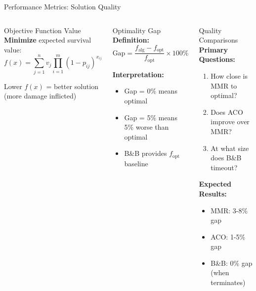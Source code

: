 \documentclass[aspectratio=43,8pt]{beamer}
\begin{document}
\begin{frame}{Performance Metrics: Solution Quality}
\begin{columns}[t]
\begin{block}{Objective Function Value}
\textbf{Minimize} expected survival value:
$$f(x) = \sum_{j=1}^{n} v_j \prod_{i=1}^{m} (1-p_{ij})^{x_{ij}}$$

Lower $f(x)$ = better solution (more damage inflicted)
\end{block}

\begin{alertblock}{Optimality Gap}
\textbf{Definition:}
$$\text{Gap} = \frac{f_{\text{alg}} - f_{\text{opt}}}{f_{\text{opt}}} \times 100\%$$

\textbf{Interpretation:}
\begin{itemize}
    \item Gap = 0\% means optimal
    \item Gap = 5\% means 5\% worse than optimal
    \item B\&B provides $f_{\text{opt}}$ baseline
\end{itemize}
\end{alertblock}

\begin{exampleblock}{Quality Comparisons}
\textbf{Primary Questions:}
\begin{enumerate}
    \item How close is MMR to optimal?
    \item Does ACO improve over MMR?
    \item At what size does B\&B timeout?
\end{enumerate}

\vspace{0.2cm}
\textbf{Expected Results:}
\begin{itemize}
    \item MMR: 3-8\% gap
    \item ACO: 1-5\% gap
    \item B\&B: 0\% gap (when terminates)
\end{itemize}
\end{exampleblock}
\end{columns}
\end{frame}
\end{document}
